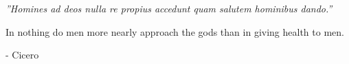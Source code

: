 \clearpage
\pagestyle{empty}  %

\null\vfill\vfill

\textit{
    ''Homines ad deos nulla re propius accedunt quam salutem hominibus dando.''
}

In nothing do men more nearly approach the gods than in giving health to men.

\begin{flushright}
    - Cicero
\end{flushright}


 
\vfill\vfill\vfill\vfill\vfill\null
